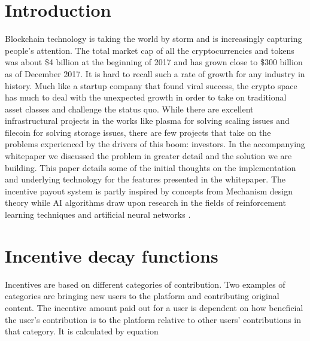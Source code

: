 \documentclass[a4paper]{article}
\begin{document}
\section{Introduction}\label{Sect:Introduction}
Blockchain technology is taking the world by storm and is increasingly capturing people’s attention. The total market cap of all the cryptocurrencies and tokens was about \$4 billion at the beginning of 2017 and has grown close to \$300 billion as of December 2017. It is hard to recall such a rate of growth for any industry in history. Much like a startup company that found viral success, the crypto space has much to deal with the unexpected growth in order to take on traditional asset classes and challenge the status quo. While there are excellent infrastructural projects in the works like plasma \cite{Plasma} for solving scaling issues and filecoin \cite{Filecoin} for solving storage issues, there are few projects that take on the problems experienced by the drivers of this boom: investors. In the accompanying whitepaper \cite{Picolo_Whitepaper} we discussed the problem in greater detail and the solution we are building. This paper details some of the initial thoughts on the implementation and underlying technology for the features presented in the whitepaper. The incentive payout system is partly inspired by concepts from Mechanism design theory \cite{Mechanism_design} while AI algorithms draw upon research in the fields of reinforcement learning techniques \cite{Reinforcement_learning} and artificial neural networks \cite{Artificial_neural_network}.


\section{Incentive decay functions}
Incentives are based on different categories of contribution. Two examples of categories are bringing new users to the platform and contributing original content. The incentive amount paid out for a user is dependent on how beneficial the user’s contribution is to the platform relative to other users’ contributions in that category. It is calculated by equation 
\end{document}
